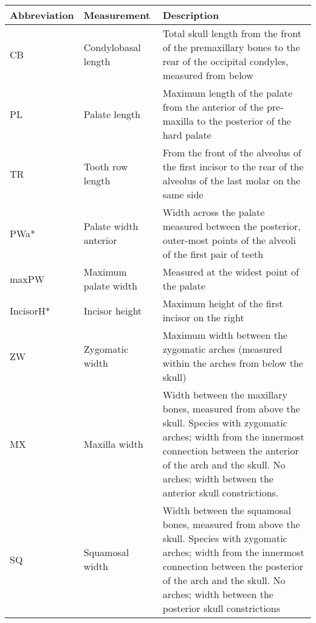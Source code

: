
\begin{tabular}{lp{3.5cm}p{9.75cm}}
\hline
\textbf{Abbreviation} & \textbf{Measurement} & \textbf{Description}\\
\hline
CB & Condylobasal length & Total skull length from the front of the premaxillary  bones to the rear of the occipital condyles, measured from below \\
PL & Palate length & Maximum length of the palate from the anterior of the pre-maxilla to the posterior of the hard palate\\
TR & Tooth row length & From the front of the alveolus of the first incisor to the rear of the alveolus of the last molar on the same side\\
PWa* & Palate width anterior & Width across the palate measured between the posterior, outer-most points of the alveoli of the first pair of teeth\\
maxPW & Maximum palate width & Measured at the widest point of the palate\\
IncisorH* & Incisor height & Maximum height of the first incisor on the right\\
ZW & Zygomatic width & Maximum width between the zygomatic arches (measured within the arches from below the skull)\\
MX & Maxilla width & Width between the maxillary bones, measured from above the skull. Species with zygomatic arches; width from the innermost connection between the anterior of the arch and the skull. No arches; width between the anterior skull constrictions.\\ 
SQ & Squamosal width & Width between the squamosal bones, measured from above the skull. Species with zygomatic arches; width from the innermost connection between the posterior of the arch and the skull. No arches; width between the posterior skull constrictions \\

\end{tabular}
